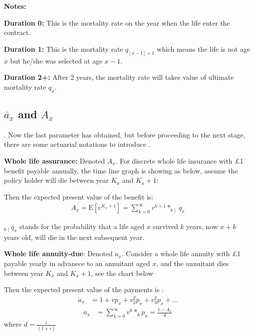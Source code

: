 \documentclass{report}
\begin{document}
\textbf{Notes:}

\textbf{Duration 0:} This is the mortality rate on the year when the life enter the contract.

\textbf{Duration 1:} This is the mortality rate $q_{[x-1]+1}$ which means the life is not age $x$ but he/she was selected at age $x-1$.

\textbf{Duration 2+:} After 2 years, the mortality rate will takes value of ultimate mortality rate $q_x$.



\subsection{$\ddot{a_x}$ and $A_x$}. 
Now the last parameter has obtained, but before proceeding to the next stage, there are some actuarial notations to introduce \cite{bib:def-for-annuity-assurance}.

\textbf{Whole life assurance:} Denoted $A_x$. For discrete whole life insurance with \pounds1 benefit payable annually, the time line graph is showing as below, assume the policy holder will die between year $K_x$ and $K_x+1$:








Then the expected present value of the benefit is:
\begin{align}
A_x = \text{E}[v^{K_x+1}] = \sum_{k=0}^{\infty} v^{k+1}*_{k\mid} q_x  
\end{align}

$_{k\mid} q_x$ stands for the probability that a life aged $x$ survived $k$ years, now $x+k$ years old, will die in the next subsequent year.

\textbf{Whole life annuity-due}: Denoted $\ddot{a}_x$. Consider a whole life annuity with \pounds1 payable yearly in advanece to an annuitant aged $x$, and the annuitant dies between year $K_x$ and $K_x+1$, see the chart below








Then the expected present value of the payments is :
\begin{align}
        \ddot{a}_x&= 1 + vp_x +v^2_2p_x +v^3_3p_x+ \dots
\end{align}
\begin{align}
        \ddot{a}_x&= \sum_{k=0}^{\infty} v^k*_kp_x = \frac{1-A_x}{d}
\end{align}
where $d=\frac{i}{(1+i)}$
\end{document}
